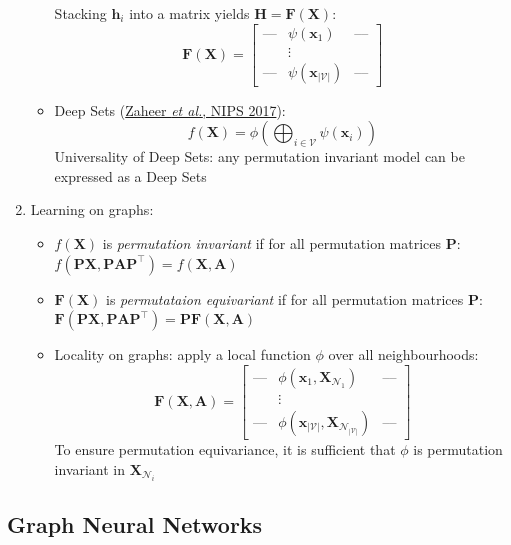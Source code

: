 \documentclass{article}
\begin{document}
\begin{enumerate}
\begin{itemize}[topsep=0pt]
		Stacking $\mathbf{h}_i$ into a matrix yields $\mathbf{H}=\bm{F}(\mathbf{X})$:
		$$\bm{F}(\mathbf{X})=\begin{bmatrix}
			\text{---} & \!\!\!\psi(\mathbf{x}_1) & \!\!\!\text{{--}{--}} \\ 
			{} & \vdots & {} \\
			\text{{--}{--}} & \!\!\!\psi(\mathbf{x}_{|\mathcal{V}|}) & \!\!\!\text{{--}{--}}
		\end{bmatrix}$$
		\item Deep Sets (\href{https://papers.nips.cc/paper/2017/file/f22e4747da1aa27e363d86d40ff442fe-Paper.pdf}{Zaheer \textit{et al.}, NIPS 2017}):
		$$f(\mathbf{X})=\phi\left(\bigoplus_{i\in\mathcal{V}}\psi(\mathbf{x}_i)\right)$$
		Universality of Deep Sets: any permutation invariant model can be expressed as a Deep Sets
	\end{itemize}

	\item Learning on graphs:
	\begin{itemize}[topsep=0pt]
		\item $f(\mathbf{X})$ is \textit{permutation invariant} if for all permutation matrices $\mathbf{P}$: $f(\mathbf{PX},\mathbf{PA}\mathbf{P}^\top)=f(\mathbf{X},\mathbf{A})$
		\item $\bm{F}(\mathbf{X})$ is \textit{permutataion equivariant} if for all permutation matrices $\mathbf{P}$: $\bm{F}(\mathbf{PX},\mathbf{PA}\mathbf{P}^\top)=\mathbf{P}\bm{F}(\mathbf{X},\mathbf{A})$ 
		\item Locality on graphs: apply a local function $\phi$ over all neighbourhoods:
		$$\bm{F}(\mathbf{X},\mathbf{A})=\begin{bmatrix}
			\text{---} & \!\!\!\phi(\mathbf{x}_1,\mathbf{X}_{\mathcal{N}_1}) & \!\!\!\text{{--}{--}} \\ 
			{} & \vdots & {} \\
			\text{{--}{--}} & \!\!\!\phi(\mathbf{x}_{|\mathcal{V}|},\mathbf{X}_{\mathcal{N}_{|\mathcal{V}|}}) & \!\!\!\text{{--}{--}}
		\end{bmatrix}$$
		To ensure permutation equivariance, it is sufficient that $\phi$ is permutation invariant in $\mathbf{X}_{\mathcal{N}_i}$
	\end{itemize}
\end{enumerate}

\subsection{Graph Neural Networks}
\end{document}
